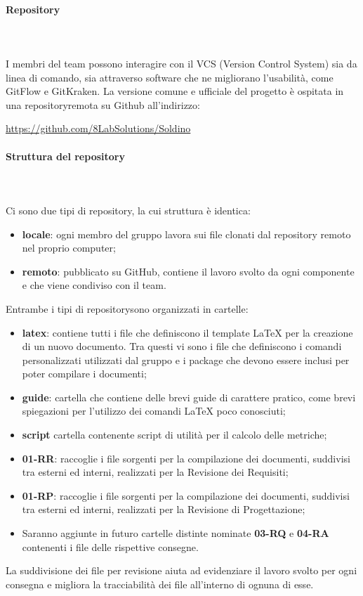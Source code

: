 	\paragraph{Repository} \mbox{}\\ \mbox{}\\
	I membri del team possono interagire con il VCS (Version Control System) sia da linea di comando, sia attraverso software che ne migliorano l'usabilità, come GitFlow e GitKraken. La versione comune e ufficiale del progetto è ospitata in una repository\glosp remota su Github all'indirizzo: \newline \newline
	\centerline{\url{https://github.com/8LabSolutions/Soldino}}
	\paragraph{Struttura del repository} \mbox{}\\ \mbox{}\\
	Ci sono due tipi di repository\glo{}, la cui struttura è identica:
	\begin{itemize}
		\item \textbf{locale}: ogni membro del gruppo lavora sui file clonati dal repository\glo{} remoto nel proprio computer;
		\item \textbf{remoto}: pubblicato su GitHub, contiene il lavoro svolto da ogni componente e che viene condiviso con il team.
	\end{itemize}						
	Entrambe i tipi di repository\glosp sono organizzati in cartelle:
	\begin{itemize}
		\item \textbf{latex}: contiene tutti i file che definiscono il template \LaTeX{} per la creazione di un nuovo documento. Tra questi vi sono i file che definiscono i comandi personalizzati utilizzati dal gruppo e i package che devono essere inclusi per poter compilare i documenti;
		\item \textbf{guide}: cartella che contiene delle brevi guide di carattere pratico, come brevi spiegazioni per l'utilizzo dei comandi \LaTeX{} poco conosciuti;
		\item \textbf{script} cartella contenente script di utilità per il calcolo delle metriche;
		\item \textbf{01-RR}: raccoglie i file sorgenti per la compilazione dei documenti, suddivisi tra esterni ed interni, realizzati per la Revisione dei Requisiti;
		\item \textbf{01-RP}: raccoglie i file sorgenti per la compilazione dei documenti, suddivisi tra esterni ed interni, realizzati per la Revisione di Progettazione;
		\item Saranno aggiunte in futuro cartelle distinte nominate \textbf{03-RQ} e \textbf{04-RA} contenenti i file delle rispettive consegne.
	\end{itemize}
	La suddivisione dei file per revisione aiuta ad evidenziare il lavoro svolto per ogni consegna e migliora la tracciabilità dei file all'interno di ognuna di esse.

